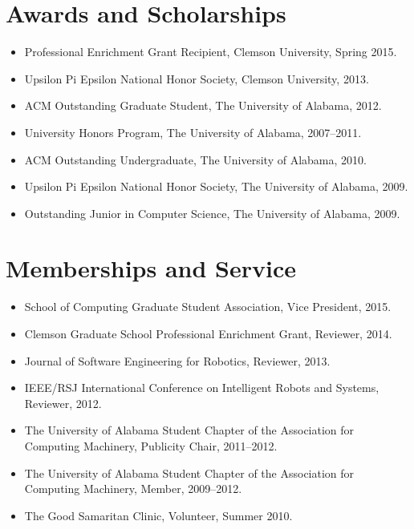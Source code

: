 \documentclass[12pt,oldfontcommands]{memoir}
\begin{document}
\nocite{*}



\section*{Awards and Scholarships}

\begin{itemize}[leftmargin=*]
  \item Professional Enrichment Grant Recipient, Clemson University, Spring
        2015.
  \item Upsilon Pi Epsilon National Honor Society, Clemson University, 2013.
  \item ACM Outstanding Graduate Student, The University of Alabama, 2012.
  \item University Honors Program, The University of Alabama, 2007--2011.
  \item ACM Outstanding Undergraduate, The University of Alabama, 2010.
  \item Upsilon Pi Epsilon National Honor Society, The University of Alabama, 2009.
  \item Outstanding Junior in Computer Science, The University of Alabama, 2009.
\end{itemize}

\section*{Memberships and Service}

\begin{itemize}[leftmargin=*]
  \item School of Computing Graduate Student Association, Vice President, 2015.
  \item Clemson Graduate School Professional Enrichment Grant, Reviewer, 2014.
  \item Journal of Software Engineering for Robotics, Reviewer, 2013.
  \item IEEE/RSJ International Conference on Intelligent Robots and
        Systems, Reviewer, 2012.
  \item The University of Alabama Student Chapter of the Association for
        Computing Machinery, Publicity Chair, 2011--2012.
  \item The University of Alabama Student Chapter of the Association for
        Computing Machinery, Member, 2009--2012.
  \item The Good Samaritan Clinic, Volunteer, Summer 2010.
\end{itemize}
\end{document}
